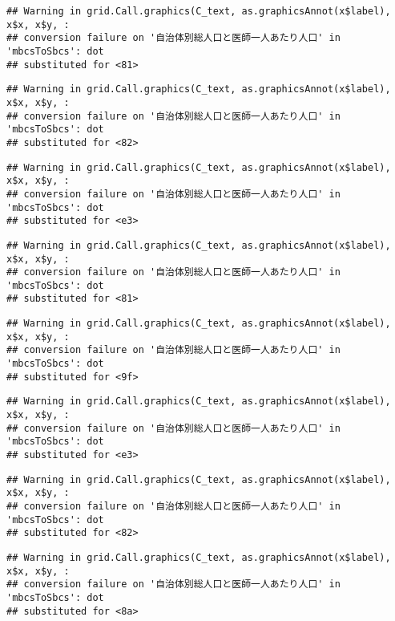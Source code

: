 \documentclass[
]{article}
\begin{document}
\begin{verbatim}
## Warning in grid.Call.graphics(C_text, as.graphicsAnnot(x$label), x$x, x$y, :
## conversion failure on '自治体別総人口と医師一人あたり人口' in 'mbcsToSbcs': dot
## substituted for <81>
\end{verbatim}

\begin{verbatim}
## Warning in grid.Call.graphics(C_text, as.graphicsAnnot(x$label), x$x, x$y, :
## conversion failure on '自治体別総人口と医師一人あたり人口' in 'mbcsToSbcs': dot
## substituted for <82>
\end{verbatim}

\begin{verbatim}
## Warning in grid.Call.graphics(C_text, as.graphicsAnnot(x$label), x$x, x$y, :
## conversion failure on '自治体別総人口と医師一人あたり人口' in 'mbcsToSbcs': dot
## substituted for <e3>
\end{verbatim}

\begin{verbatim}
## Warning in grid.Call.graphics(C_text, as.graphicsAnnot(x$label), x$x, x$y, :
## conversion failure on '自治体別総人口と医師一人あたり人口' in 'mbcsToSbcs': dot
## substituted for <81>
\end{verbatim}

\begin{verbatim}
## Warning in grid.Call.graphics(C_text, as.graphicsAnnot(x$label), x$x, x$y, :
## conversion failure on '自治体別総人口と医師一人あたり人口' in 'mbcsToSbcs': dot
## substituted for <9f>
\end{verbatim}

\begin{verbatim}
## Warning in grid.Call.graphics(C_text, as.graphicsAnnot(x$label), x$x, x$y, :
## conversion failure on '自治体別総人口と医師一人あたり人口' in 'mbcsToSbcs': dot
## substituted for <e3>
\end{verbatim}

\begin{verbatim}
## Warning in grid.Call.graphics(C_text, as.graphicsAnnot(x$label), x$x, x$y, :
## conversion failure on '自治体別総人口と医師一人あたり人口' in 'mbcsToSbcs': dot
## substituted for <82>
\end{verbatim}

\begin{verbatim}
## Warning in grid.Call.graphics(C_text, as.graphicsAnnot(x$label), x$x, x$y, :
## conversion failure on '自治体別総人口と医師一人あたり人口' in 'mbcsToSbcs': dot
## substituted for <8a>
\end{verbatim}
\end{document}
